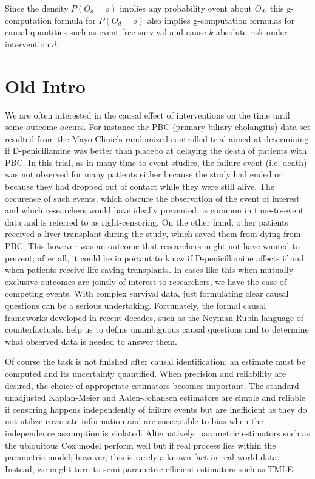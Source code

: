 \documentclass{report}
\newcommand{\1}{\ensuremath{\mathbf{1}}}
\begin{document}
Since the density \(P(O_d=o)\) implies any probability event about \(O_d\), this g-computation formula for \(P(O_d=o)\) also implies g-computation formulas for causal quantities such as event-free survival and cause-\(k\) absolute risk under intervention \(d\). 


\section{Old Intro}
\label{sec:org4a630b7}

We are often interested in the causal effect of interventions on the time until some outcome occurs. For instance the PBC (primary biliary cholangitis) data set resulted from the Mayo Clinic's randomized controlled trial aimed at determining if D-penicillamine was better than placebo at delaying the death of patients with PBC. In this trial, as in many time-to-event studies, the failure event (i.e. death) was not observed for many patients either because the study had ended or because they had dropped out of contact while they were still alive. The occurence of such events, which obscure the observation of the event of interest and which researchers would have ideally prevented, is common in time-to-event data and is referred to as right-censoring. On the other hand, other patients received a liver transplant during the study, which saved them from dying from PBC; This however was an outcome that researchers might not have wanted to prevent; after all, it could be important to know if D-penicillamine affects if and when patients receive life-saving transplants. In cases like this when mutually exclusive outcomes are jointly of interest to researchers, we have the case of competing events. With complex survival data, just formulating clear causal questions can be a serious undertaking. Fortunately, the formal causal frameworks developed in recent decades, such as the Neyman-Rubin language of counterfactuals, help us to define unambiguous causal questions and to determine what observed data is needed to answer them. 

Of course the task is not finished after causal identification; an estimate must be computed and its uncertainty quantified. When precision and reliability are desired, the choice of appropriate estimators becomes important. The standard unadjusted Kaplan-Meier and Aalen-Johansen estimators are simple and reliable if censoring happens independently of failure events but are inefficient as they do not utilize covariate information and are susceptible to bias when the independence assumption is violated. Alternatively, parametric estimators such as the ubiquitous Cox model perform well but if real process lies within the parametric model; however, this is rarely a known fact in real world data. Instead, we might turn to semi-parametric efficient estimators such as TMLE.
\end{document}
